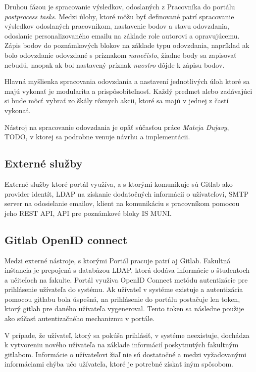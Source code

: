 \documentclass[
  digital, %
  twoside, %
  table,   %
  lof,     %
  lot,     %
]{fithesis3}
\begin{document}
Druhou fázou je spracovanie výsledkov, odoslaných z Pracovníka do portálu \emph{postprocess tasks}. Medzi úlohy, ktoré môžu byť definované patrí spracovanie výsledkov odoslaných pracovníkom, nastavenie bodov a stavu odovzdania, odoslanie personalizovaného emailu na základe role autorovi a opravujúcemu. Zápis bodov do poznámkových blokov na základe typu odovzdania, napríklad ak bolo odovzdanie odovzdané s príznakom \emph{nanečisto}, žiadne body sa zapisovať nebudú, naopak ak bol nastavený príznak \emph{naostro} dôjde k zápisu bodov.

Hlavná myšlienka spracovania odovzdania a nastavení jednotlivých úloh ktoré sa majú vykonať je modularita a prispôsobiteľnosť. Každý predmet alebo zadávajúci si bude môcť vybrať zo škály rôznych akcii, ktoré sa majú v jednej z častí vykonať.


Nástroj na spracovanie odovzdania je opäť súčasťou práce \emph{Mateja Dujavy}, TODO, v ktorej sa podrobne venuje návrhu a implementácii.

\subsection{Externé služby}

Externé služby ktoré portál využíva, a s ktorými komunikuje sú Gitlab ako provider identít, LDAP na získanie dodatočných informácii o užívateľovi, SMTP server na odosielanie emailov, klient na komunikáciu s pracovníkom pomocou jeho REST API, API pre poznámkové bloky IS MUNI. 


\subsection{Gitlab OpenID connect}

Medzi externé nástroje, s ktorými Portál pracuje patrí aj Gitlab. Fakultná inštancia je prepojená s databázou LDAP, ktorá dodáva informácie o študentoch a učiteľoch na fakulte. Portál využiva OpenID Connect metódu autentizácie pre prihlásenie užívateľa do systému. 
Ak užívateľ v systéme existuje a autentizácia pomocou gitlabu bola úspešná, na prihlásenie do portálu postačuje len token, ktorý gitlab pre daného užívateľa vygeneroval. Tento token sa následne použije ako súčasť autentizačného mechanizmu v portále.

V prípade, že užívateľ, ktorý sa pokúša prihlásiť, v systéme neexistuje, dochádza k vytvoreniu nového užívateľa na základe informácií poskytnutých fakultným gitlabom. Informácie o užívateľovi žiaľ nie sú dostatočné a medzi vyžadovanými informáciami chýba učo užívateľa, ktoré je potrebné získať iným spôsobom.
\end{document}
